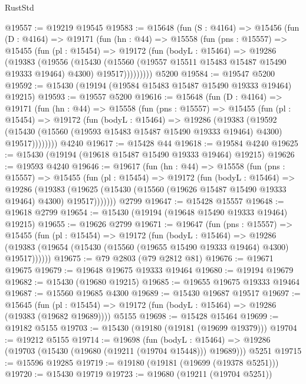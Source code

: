 \begin{lexlean}{RustStd}
\begin{coremodule}
@19557 := @19219 @19545
@19583 := @15648
    (fun (S : @4164) =>
    @15456
      (fun (D : @4164) =>
      @19171
        (fun (hn : @44) =>
        @15558
          (fun (pns : @15557) =>
          @15455
            (fun (pl : @15454) =>
            @19172
              (fun (bodyL : @15464) =>
              @19286
                (@19383
                  (@19556
                    (@15430
                      (@15560 (@19557 @15511 @15483 @15487 @15490 @19333 @19464) @4300)
                      @19517)))))))))
    @5200
@19584 := @19547 @5200
@19592 := @15430 (@19194 (@19584 @15483 @15487 @15490 @19333 @19464) @19215)
@19593 := @19557 @5200
@19616 := @15648
    (fun (D : @4164) =>
    @19171
      (fun (hn : @44) =>
      @15558
        (fun (pns : @15557) =>
        @15455
          (fun (pl : @15454) =>
          @19172
            (fun (bodyL : @15464) =>
            @19286
              (@19383
                (@19592
                  (@15430 (@15560 (@19593 @15483 @15487 @15490 @19333 @19464) @4300) @19517))))))))
    @4240
@19617 := @15428 @44
@19618 := @19584 @4240
@19625 := @15430 (@19194 (@19618 @15487 @15490 @19333 @19464) @19215)
@19626 := @19593 @4240
@19646 := @19617
    (fun (hn : @44) =>
    @15558
      (fun (pns : @15557) =>
      @15455
        (fun (pl : @15454) =>
        @19172
          (fun (bodyL : @15464) =>
          @19286
            (@19383
              (@19625 (@15430 (@15560 (@19626 @15487 @15490 @19333 @19464) @4300) @19517)))))))
    @2799
@19647 := @15428 @15557
@19648 := @19618 @2799
@19654 := @15430 (@19194 (@19648 @15490 @19333 @19464) @19215)
@19655 := @19626 @2799
@19671 := @19647
    (fun (pns : @15557) =>
    @15455
      (fun (pl : @15454) =>
      @19172
        (fun (bodyL : @15464) =>
        @19286 (@19383 (@19654 (@15430 (@15560 (@19655 @15490 @19333 @19464) @4300) @19517))))))
@19675 := @79 @2803 (@79 @2812 @81)
@19676 := @19671 @19675
@19679 := @19648 @19675 @19333 @19464
@19680 := @19194 @19679
@19682 := @15430 (@19680 @19215)
@19685 := @19655 @19675 @19333 @19464
@19687 := @15560 @19685 @4300
@19689 := @15430 @19687 @19517
@19697 := @15645
    (fun (pl : @15454) => @19172 (fun (bodyL : @15464) => @19286 (@19383 (@19682 @19689))))
    @5155
@19698 := @15428 @15464
@19699 := @19182 @5155
@19703 := @15430 (@19180 (@19181 (@19699 @19379)))
@19704 := @19212 @5155
@19714 := @19698
    (fun (bodyL : @15464) => @19286 (@19703 (@15430 (@19680 (@19211 (@19704 @15448))) @19689)))
    @5251
@19715 := @15596 @19285
@19719 := @19180 (@19181 (@19699 (@19378 @5251)))
@19720 := @15430 @19719
@19723 := @19680 (@19211 (@19704 @5251))

\end{coremodule}
\end{lexlean}
